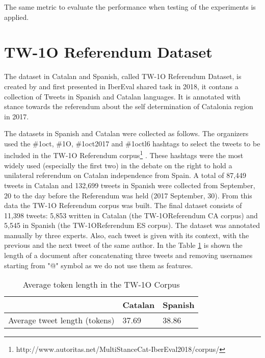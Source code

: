 \documentclass[10pt, a4paper]{article}
\begin{document}
The same metric to evaluate the performance when testing of the experiments is applied. 


\section{TW-1O Referendum Dataset}

The dataset in Catalan and Spanish, called TW-1O Referendum Dataset, is created by \cite{taule18} and first presented in IberEval shared task in 2018, it contans a collection of Tweets in Spanish and Catalan languages. It is annotated with stance towards the referendum about the self determination of Catalonia region in 2017. 

The datasets in Spanish and Catalan were collected as follows. The organizers used the \#1oct, \#1O, \#1oct2017 and \#1octl6 hashtags to select the tweets to be included in the TW-1O Referendum corpus\footnote{http://www.autoritas.net/MultiStanceCat-IberEval2018/corpus/} \cite{taule18}. These hashtags were the most widely used (especially the first two) in the debate on the right to hold a unilateral referendum on Catalan independence from Spain. A total of 87,449 tweets in Catalan and 132,699 tweets in Spanish were collected from September, 20 to the day before the Referendum was held (2017 September, 30). From this data the TW-1O Referendum corpus was built. The final dataset consists of 11,398 tweets: 5,853 written in Catalan (the TW-1OReferendum CA corpus) and 5,545 in Spanish (the TW-1OReferendum ES corpus). The dataset was annotated manually by three experts. Also, each tweet is given with its context, with the previous and the next tweet of the same author. In the Table \ref{tab:length_tw_dataset} is shown the length of a document after concatenating three tweets and removing usernames starting from "@" symbol as we do not use them as features.

\begin{table}[!h]
\begin{center}
\begin{tabularx}{\columnwidth}{|l|l|X|}

      \hline
        &Catalan&Spanish\\
      \hline
        Average tweet length (tokens) & 37.69 & 38.86\\
      \hline


\end{tabularx}
\caption{Average token length in the TW-1O Corpus}
 \end{center}
 \label{tab:length_tw_dataset}
\end{table}
\end{document}
